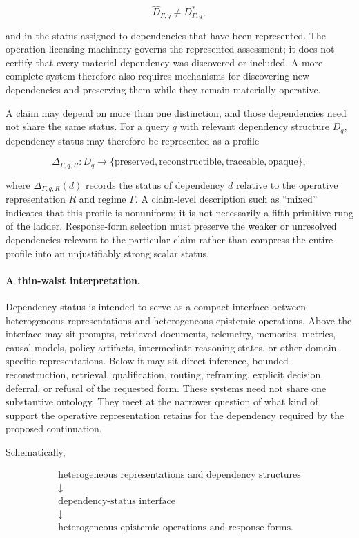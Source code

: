 \documentclass[11pt]{article}
\theoremstyle{definition}
\theoremstyle{remark}
\begin{document}
\[
\widehat D_{\Gamma,q}\neq D^*_{\Gamma,q},
\]

and in the status assigned to dependencies that have been represented. The operation-licensing machinery governs the represented assessment; it does not certify that every material dependency was discovered or included. A more complete system therefore also requires mechanisms for discovering new dependencies and preserving them while they remain materially operative.

A claim may depend on more than one distinction, and those dependencies need not share the same status. For a query \(q\) with relevant dependency structure \(D_q\), dependency status may therefore be represented as a profile

\[
\Delta_{\Gamma,q,R}:D_q
\rightarrow
\{\text{preserved},\text{reconstructible},
\text{traceable},\text{opaque}\},
\]

where \(\Delta_{\Gamma,q,R}(d)\) records the status of dependency \(d\) relative to the operative representation \(R\) and regime \(\Gamma\). A claim-level description such as ``mixed'' indicates that this profile is nonuniform; it is not necessarily a fifth primitive rung of the ladder. Response-form selection must preserve the weaker or unresolved dependencies relevant to the particular claim rather than compress the entire profile into an unjustifiably strong scalar status.

\paragraph{A thin-waist interpretation.}
Dependency status is intended to serve as a compact interface between heterogeneous representations and heterogeneous epistemic operations. Above the interface may sit prompts, retrieved documents, telemetry, memories, metrics, causal models, policy artifacts, intermediate reasoning states, or other domain-specific representations. Below it may sit direct inference, bounded reconstruction, retrieval, qualification, routing, reframing, explicit decision, deferral, or refusal of the requested form. These systems need not share one substantive ontology. They meet at the narrower question of what kind of support the operative representation retains for the dependency required by the proposed continuation.

Schematically,

\[
\boxed{
\begin{array}{c}
\text{heterogeneous representations and dependency structures}
\\[0.25em]
\downarrow
\\[0.25em]
\text{dependency-status interface}
\\[0.25em]
\downarrow
\\[0.25em]
\text{heterogeneous epistemic operations and response forms}.
\end{array}
}
\]
\end{document}
